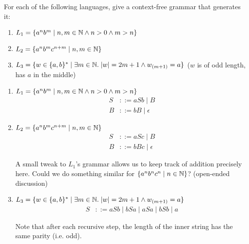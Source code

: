 
\begin{exercise}{}

  For each of the following languages, give a context-free grammar that
  generates it:

  \begin{enumerate}
    \item \(L_1 = \{a^nb^m \mid n, m \in \mathbb{N} \land n > 0 \land m > n\}\)
    \item \(L_2 = \{a^nb^mc^{n+m} \mid n, m \in \mathbb{N}\}\)
    \item \(L_3 = \{w \in \{a, b\}^* \mid \exists m \in \mathbb{N}.\; |w| = 2m +
    1 \land w_{(m+1)} = a \}\) (\(w\) is of odd length, has \(a\) in the middle)
  \end{enumerate}

  \begin{solution}
    \begin{enumerate}
      \item \(L_1 = \{a^nb^m \mid n, m \in \mathbb{N} \land n > 0 \land m > n\}\)
      \begin{align*}
        S &::= aSb \mid B\\
        B &::= bB \mid \epsilon
      \end{align*}
      \item \(L_2 = \{a^nb^mc^{n+m} \mid n, m \in \mathbb{N}\}\)
      \begin{align*}
        S &::= aSc \mid B\\
        B &::= bBc \mid \epsilon
      \end{align*}

      A small tweak to \(L_1\)'s grammar allows us to keep track of addition
      precisely here. Could we do something similar for \(\{a^nb^nc^n \mid n \in
      \mathbb{N}\}\)? (open-ended discussion)

      \item \(L_3 = \{w \in \{a, b\}^* \mid \exists m \in \mathbb{N}.\; |w| = 2m +
      1 \land w_{(m+1)} = a \}\)
      \begin{align*}
        S &::= aSb \mid bSa \mid aSa \mid bSb \mid a
      \end{align*}

      Note that after each recursive step, the length of the inner string has
      the same parity (i.e. odd).
    \end{enumerate}    
  \end{solution}
  
\end{exercise}

